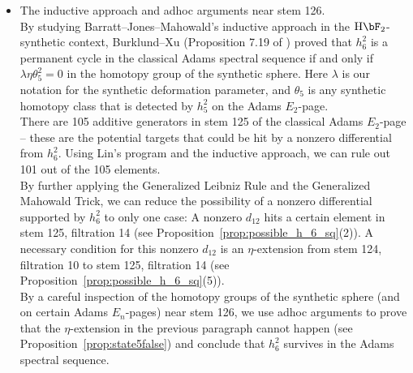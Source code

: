 \documentclass{amsart}
\numberwithin{equation}{section}
\newcommand{\HF}{\mathrm{H}\bF_2}
\begin{document}
\begin{itemize}
    \item The inductive approach and adhoc arguments near stem 126.\\

    \noindent By studying Barratt--Jones--Mahowald's inductive approach \cite{BJMinduction} in the $\HF$-synthetic context, Burklund--Xu (Proposition 7.19 of \cite{BurklundXu}) proved that $h_6^2$ is a permanent cycle in the classical Adams spectral sequence if and only if $\lambda \eta \theta_5^2 = 0$ in the homotopy group of the synthetic sphere. Here $\lambda$ is our notation for the synthetic deformation parameter, and $\theta_5$ is any synthetic homotopy class that is detected by $h_5^2$ on the Adams $E_2$-page.   \\

    \noindent There are 105 additive generators in stem 125 of the classical Adams $E_2$-page -- these are the potential targets that could be hit by a nonzero differential from $h_6^2$. Using Lin's program and the inductive approach, we can rule out 101 out of the 105 elements.\\
    
    \noindent By further applying the Generalized Leibniz Rule and the Generalized Mahowald Trick, we can reduce the possibility of a nonzero differential supported by $h_6^2$ to only one case: A nonzero $d_{12}$ hits a certain element in stem 125, filtration 14 (see Proposition~\ref{prop:possible_h_6_sq}(2)). A necessary condition for this nonzero $d_{12}$ is an $\eta$-extension from stem 124, filtration 10 to stem 125, filtration 14 (see Proposition~\ref{prop:possible_h_6_sq}(5)). \\
    
    \noindent By a careful inspection of the homotopy groups of the synthetic sphere (and on certain Adams $E_n$-pages) near stem 126, we use adhoc arguments to prove that the $\eta$-extension in the previous paragraph cannot happen (see Proposition~\ref{prop:state5false}) and conclude that $h_6^2$ survives in the Adams spectral sequence. \\
\end{itemize} 
\end{document}
